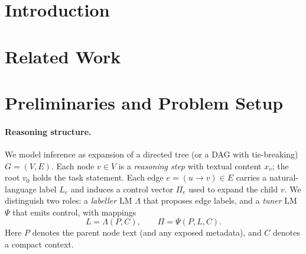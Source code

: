\documentclass{article}
\theoremstyle{plain}
\theoremstyle{definition}
\theoremstyle{remark}
\begin{document}

\printAffiliationsAndNotice{}

\begin{abstract}
\end{abstract}

\section{Introduction}

\section{Related Work}



\section{Preliminaries and Problem Setup}
\label{sec:prelims}

\paragraph{Reasoning structure.}
We model inference as expansion of a directed tree (or a DAG with tie-breaking) $G=(V,E)$.
Each node $v\in V$ is a \emph{reasoning step} with textual content $x_v$; the root $v_0$ holds the task statement.
Each edge $e=(u\!\rightarrow\! v)\in E$ carries a natural-language label $L_e$ and induces a control vector $\Pi_e$ used to expand the child $v$.
We distinguish two roles: a \emph{labeller} LM $\Lambda$ that proposes edge labels, and a \emph{tuner} LM $\Psi$ that emits control, with mappings
\begin{equation*}
  L=\Lambda(P,C), \qquad \Pi=\Psi(P,L,C).
\end{equation*}
Here $P$ denotes the parent node text (and any exposed metadata), and $C$ denotes a compact context.
\end{document}
